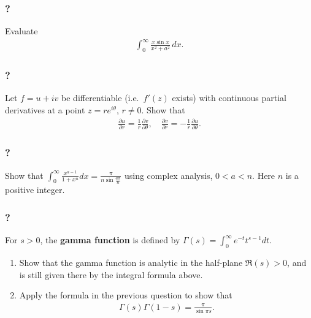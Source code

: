 \hypertarget{section-85}{%
\subsubsection{?}\label{section-85}}

Evaluate
\begin{align*}\displaystyle{ \int_{0}^{\infty}\frac{x\sin x}{x^2+a^2} \,
dx }.\end{align*}

\hypertarget{section-86}{%
\subsubsection{?}\label{section-86}}

Let \(f=u+iv\) be differentiable (i.e.~\(f'(z)\) exists) with continuous
partial derivatives at a point \(z=re^{i\theta}\), \(r\not= 0\). Show
that
\begin{align*}\frac{\partial u}{\partial r}=\frac{1}{r}\frac{\partial v}{\partial \theta},\quad
\frac{\partial v}{\partial r}=-\frac{1}{r}\frac{\partial u}{\partial \theta}.\end{align*}

\hypertarget{section-87}{%
\subsubsection{?}\label{section-87}}

Show that
\(\displaystyle \int_0^\infty \frac{x^{a-1}}{1+x^n} dx=\frac{\pi}{n\sin \frac{a\pi}{n}}\)
using complex analysis, \(0< a < n\). Here \(n\) is a positive integer.

\hypertarget{section-88}{%
\subsubsection{?}\label{section-88}}

For \(s>0\), the \textbf{gamma function} is defined by
\(\displaystyle{\Gamma(s)=\int_0^{\infty} e^{-t}t^{s-1} dt}\).

\begin{enumerate}
\def\labelenumi{\arabic{enumi}.}
\item
  Show that the gamma function is analytic in the half-plane
  \(\Re (s)>0\), and is still given there by the integral formula above.
\item
  Apply the formula in the previous question to show that
  \begin{align*}\Gamma(s)\Gamma(1-s)=\frac{\pi}{\sin \pi s}.\end{align*}
\end{enumerate}

